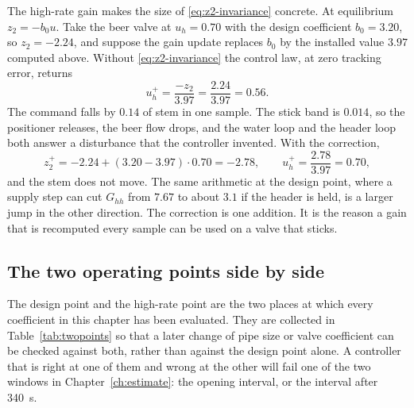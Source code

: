 The high-rate gain makes the size of \eqref{eq:z2-invariance} concrete. At equilibrium $z_2 = -b_0 u$. Take the beer valve at $u_h=0.70$ with the design coefficient $b_0=3.20$, so $z_2=-2.24$, and suppose the gain update replaces $b_0$ by the installed value $3.97$ computed above. Without \eqref{eq:z2-invariance} the control law, at zero tracking error, returns
\begin{equation}
u_h^+ = \frac{-z_2}{3.97} = \frac{2.24}{3.97} = 0.56.
\end{equation}
The command falls by $0.14$ of stem in one sample. The stick band is $0.014$, so the positioner releases, the beer flow drops, and the water loop and the header loop both answer a disturbance that the controller invented. With the correction,
\begin{equation}
z_2^+ = -2.24 + (3.20-3.97)\cdot 0.70 = -2.78, \qquad u_h^+ = \frac{2.78}{3.97} = 0.70,
\end{equation}
and the stem does not move. The same arithmetic at the design point, where a supply step can cut $G_{hh}$ from $7.67$ to about $3.1$ if the header is held, is a larger jump in the other direction. The correction is one addition. It is the reason a gain that is recomputed every sample can be used on a valve that sticks.

\subsection{The two operating points side by side}

The design point and the high-rate point are the two places at which every coefficient in this chapter has been evaluated. They are collected in Table~\ref{tab:twopoints} so that a later change of pipe size or valve coefficient can be checked against both, rather than against the design point alone. A controller that is right at one of them and wrong at the other will fail one of the two windows in Chapter~\ref{ch:estimate}: the opening interval, or the interval after \SI{340}{s}.

